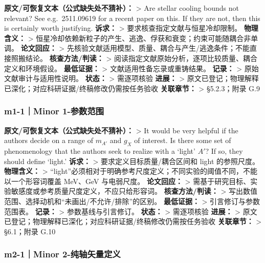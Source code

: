\documentclass[
  chinese,
  UTF8]{ctexart}
\begin{document}
\textbf{原文/可恢复文本（公式缺失处不猜补）：} \textgreater{} Are
stellar cooling bounds not relevant? See e.g.~2511.09619 for a recent
paper on this. If they are not, then this is certainly worth justifying.
\textbf{诉求：} \textgreater{} 要求核查指定文献与恒星冷却限制。
\textbf{物理含义：} \textgreater{}
恒星冷却依赖新粒子的产生、逃逸、俘获和衰变；约束可能随耦合非单调。
\textbf{论文回应：} \textgreater{}
先核验文献适用模型、质量、耦合与产生/逃逸条件；不能直接照搬结论。
\textbf{核查方法/判读：} \textgreater{}
阅读指定文献原始分析，逐项比较质量、耦合定义和环境假设。
\textbf{最低证据：} \textgreater{} 文献适用性备忘录或重铸结果。
\textbf{记录：} \textgreater{} 原始文献审计与适用性说明。
\textbf{状态：} \textgreater{} 需逐项核验 \textbf{进展：} \textgreater{}
原文已登记；物理解释已深化；对应科研证据/终稿修改仍需按任务验收
\textbf{关联章节：} \textgreater{} §5.2.3；附录 G.9

\subsubsection{m1-1｜Minor
1-参数范围}\label{m1-1minor-1-ux53c2ux6570ux8303ux56f4}

\textbf{原文/可恢复文本（公式缺失处不猜补）：} \textgreater{} It would
be very helpful if the authors decide on a range of \(m_{A'}\) and
\(g_X\) of interest. Is there some set of phenomenology that the authors
seek to realize with a `light' \(A'\)? If so, they should define
`light.' \textbf{诉求：} \textgreater{} 要求定义目标质量/耦合区间和
light 的参照尺度。 \textbf{物理含义：} \textgreater{}
``light''必须相对于明确参考尺度定义；不同实验的阈值不同，不能以一个形容词覆盖
MeV、GeV 与电弱尺度。 \textbf{论文回应：} \textgreater{}
需基于研究目标、实验敏感度或参考质量尺度定义，不应只给形容词。
\textbf{核查方法/判读：} \textgreater{}
写出数值范围、选择动机和``未画出/不允许/排除''的区别。
\textbf{最低证据：} \textgreater{} 引言修订与参数范围表。
\textbf{记录：} \textgreater{} 参数基线与引言修订。 \textbf{状态：}
\textgreater{} 需逐项核验 \textbf{进展：} \textgreater{}
原文已登记；物理解释已深化；对应科研证据/终稿修改仍需按任务验收
\textbf{关联章节：} \textgreater{} §6.1；附录 G.10

\subsubsection{m2-1｜Minor
2-纯轴矢量定义}\label{m2-1minor-2-ux7eafux8f74ux77e2ux91cfux5b9aux4e49}
\end{document}
